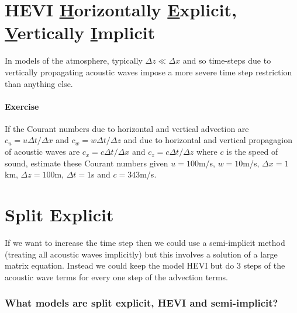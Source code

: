 \clearpage{}

\section*{HEVI \textendash{}\uline{ H}orizontally \uline{E}xplicit, \uline{V}ertically
\uline{I}mplicit}

In models of the atmosphere, typically $\Delta z\ll\Delta x$ and
so time-steps due to vertically propagating acoustic waves impose
a more severe time step restriction than anything else. 

\paragraph*{Exercise}

If the Courant numbers due to horizontal and vertical advection are
$c_{u}=u\Delta t/\Delta x$ and $c_{w}=w\Delta t/\Delta z$ and due
to horizontal and vertical propagagion of acoustic waves are $c_{x}=c\Delta t/\Delta x$
and $c_{z}=c\Delta t/\Delta z$ where $c$ is the speed of sound,
estimate these Courant numbers given $u=100$m/s, $w=10$m/s, $\Delta x=1$km,
$\Delta z=100$m, $\Delta t=1$s and $c=343$m/s. 


\clearpage{}

\section*{Split Explicit}

If we want to increase the time step then we could use a semi-implicit
method (treating all acoustic waves implicitly) but this involves
a solution of a large matrix equation. Instead we could keep the model
HEVI but do 3 steps of the acoustic wave terms for every one step
of the advection terms. 

\subsubsection*{What models are split explicit, HEVI and semi-implicit?}

